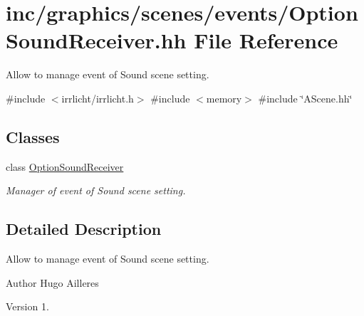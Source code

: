 \hypertarget{OptionSoundReceiver_8hh}{}\section{inc/graphics/scenes/events/\+Option\+Sound\+Receiver.hh File Reference}
\label{OptionSoundReceiver_8hh}


Allow to manage event of Sound scene setting.  


{\ttfamily \#include $<$irrlicht/irrlicht.\+h$>$}\newline
{\ttfamily \#include $<$memory$>$}\newline
{\ttfamily \#include \char`\"{}A\+Scene.\+hh\char`\"{}}\newline
\subsection*{Classes}
\begin{DoxyCompactItemize}
\item 
class \hyperlink{classOptionSoundReceiver}{Option\+Sound\+Receiver}
\begin{DoxyCompactList}\small\item\em Manager of event of Sound scene setting. \end{DoxyCompactList}\end{DoxyCompactItemize}


\subsection{Detailed Description}
Allow to manage event of Sound scene setting. 

\begin{DoxyAuthor}{Author}
Hugo Ailleres 
\end{DoxyAuthor}
\begin{DoxyVersion}{Version}
1. 
\end{DoxyVersion}
